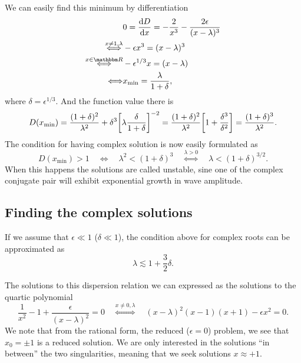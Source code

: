 \documentclass[11pt,a4paper, 
swedish, english %
]{article}
\begin{document}
We can easily find this minimum by differentiation
\begin{equation}
\begin{aligned}
&0=\dv{D}{x}=-\frac{2}{x^3}-\frac{2\epsilon}{(x-\lambda)^3}\\
\stackrel{x\neq1, \lambda}{\Longleftrightarrow}&
-\epsilon x^3 = (x-\lambda)^3\\
\stackrel{x\in\R}{\Longleftrightarrow}&
-\epsilon^{1/3} x = (x-\lambda)\\
\Longleftrightarrow&
x_{\min}=\frac{\lambda}{1+\delta},
\end{aligned}
\end{equation}
where $\delta=\epsilon^{1/3}$. And the function value there is
\begin{equation}
D(x_{\min}) = \frac{(1+\delta)^2}{\lambda^2}
+\delta^3\qty[\lambda\frac{\delta}{1+\delta}]^{-2}
=\frac{(1+\delta)^2}{\lambda^2}\qty[1+\frac{\delta^3}{\delta^2}]
=\frac{(1+\delta)^3}{\lambda^2}.
\end{equation}
The condition for having complex solution is now easily formulated as
\begin{equation}
D(x_{\min}) > 1
\quad\Longleftrightarrow\quad
\lambda^2<(1+\delta)^3
\quad\stackrel{\lambda>0}{\Longleftrightarrow}\quad
\lambda<(1+\delta)^{3/2}.
\end{equation}
When this happens the solutions are called unstable, sine one of the
complex conjugate pair will exhibit exponential growth in wave
amplitude. 

\subsection*{Finding the complex solutions}
If we assume that $\epsilon\ll1$ ($\delta\ll1$), the condition above
for complex roots can be approximated as
\begin{equation}
\lambda\lesssim 1+\frac{3}{2}\delta.
\end{equation}

The solutions to this dispersion relation we can expressed as the
solutions to the quartic polynomial 
\begin{equation}
\frac{1}{x^2}-1+\frac{\epsilon}{(x-\lambda)^2}=0
\quad\stackrel{x\neq0, \lambda}{\Longleftrightarrow}\quad
(x-\lambda)^2(x-1)(x+1)-\epsilon x^2=0.
\end{equation}
We note that from the rational form, the reduced ($\epsilon=0$)
problem, we see that $x_0=\pm1$ is a reduced solution. We are only
interested in the solutions ``in between'' the two singularities,
meaning that we seek solutions $x\approx+1$.
\end{document}
